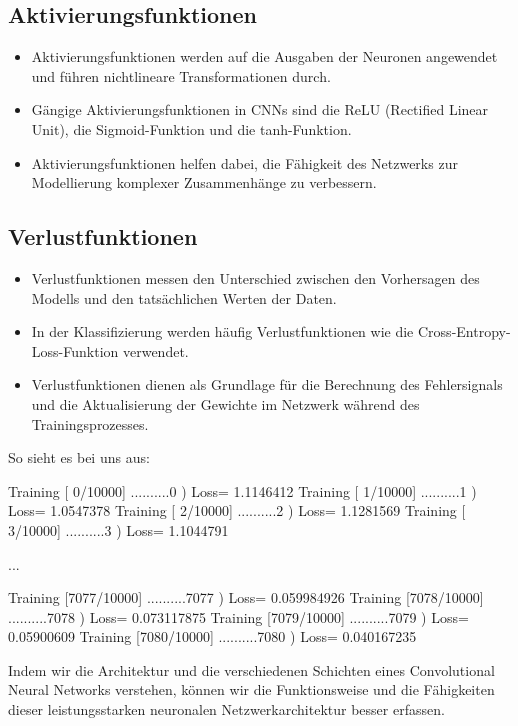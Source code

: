 \subsection{Aktivierungsfunktionen}
\begin{itemize}
  \item Aktivierungsfunktionen werden auf die Ausgaben der Neuronen angewendet und führen nichtlineare Transformationen durch.
  \item Gängige Aktivierungsfunktionen in CNNs sind die ReLU (Rectified Linear Unit), die Sigmoid-Funktion und die tanh-Funktion.
  \item Aktivierungsfunktionen helfen dabei, die Fähigkeit des Netzwerks zur Modellierung komplexer Zusammenhänge zu verbessern.
\end{itemize}

\subsection{Verlustfunktionen}
\begin{itemize}
  \item Verlustfunktionen messen den Unterschied zwischen den Vorhersagen des Modells und den tatsächlichen Werten der Daten.
  \item In der Klassifizierung werden häufig Verlustfunktionen wie die Cross-Entropy-Loss-Funktion verwendet.
  \item Verlustfunktionen dienen als Grundlage für die Berechnung des Fehlersignals und die Aktualisierung der Gewichte im Netzwerk während des Trainingsprozesses.
\end{itemize}

So sieht es bei uns aus:

Training [   0/10000] ..........0 ) Loss= 1.1146412
Training [   1/10000] ..........1 ) Loss= 1.0547378
Training [   2/10000] ..........2 ) Loss= 1.1281569
Training [   3/10000] ..........3 ) Loss= 1.1044791

...

Training [7077/10000] ..........7077 ) Loss= 0.059984926
Training [7078/10000] ..........7078 ) Loss= 0.073117875
Training [7079/10000] ..........7079 ) Loss= 0.05900609
Training [7080/10000] ..........7080 ) Loss= 0.040167235



Indem wir die Architektur und die verschiedenen Schichten eines Convolutional Neural Networks verstehen, können wir die Funktionsweise und die Fähigkeiten dieser leistungsstarken neuronalen Netzwerkarchitektur besser erfassen.
